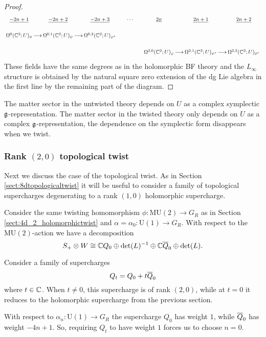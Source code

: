 \documentclass[10pt, oneside]{article}
\newcommand{\MU}{\mathrm{MU}}
\renewcommand{\U}{\mathrm{U}}
\begin{document}
\begin{proof}
\[
\xymatrix@R=0.5cm@C=0.5cm{
\ul{-2n+1} & \ul{-2n+2} & \ul{-2n+3} & \cdots & \ul{2n} & \ul{2n+1} & \ul{2n+2} \\ 
\Omega^0(\CC^2 ; U)_\phi \ar[r] & \Omega^{0,1}(\CC^2 ; U)_\psi \ar[r] & \Omega^{0,2}(\CC^2 ; U)_{\varphi^*} \\
& & & & \Omega^{2,0}(\CC^2 ; U)_{\varphi} \ar[r] & \Omega^{2,1}(\CC^2 ; U)_{\psi^*} \ar[r] & \Omega^{2,2}(\CC^2 ; U)_{\phi^*}
}
\]
These fields have the same degrees as in the holomorphic BF theory and the $L_\infty$ structure is obtained by the natural square zero extension of the dg Lie algebra in the first line by the remaining part of the diagram.
\end{proof}

\begin{remark}
The matter sector in the untwisted theory depends on $U$ as a complex symplectic $\fg$-representation. 
The matter sector in the twisted theory only depends on $U$ as a complex $\fg$-representation, the dependence on the symplectic form disappears when we twist.
\end{remark}

\subsubsection{Rank \texorpdfstring{$(2,0)$}{(2,0)} topological twist}
\label{sect:4d_2_donaldson}

Next we discuss the case of the topological twist. As in Section \ref{sect:8dtopologicaltwist} it will be useful to consider a family of topological supercharges degenerating to a rank $(1, 0)$ holomorphic supercharge.

Consider the same twisting homomorphism $\phi\colon \MU(2)\rightarrow G_R$ as in Section \ref{sect:4d_2_holomorphictwist} and $\alpha=\alpha_0\colon \U(1)\rightarrow G_R$. With respect to the $\MU(2)$-action we have a decomposition
\[S_+\otimes W\cong \CC Q_0 \oplus \det(L)^{-1}\oplus \CC \Bar{Q}_0\oplus \det(L).\]

Consider a family of supercharges
\begin{equation} 
\label{eq:4dHodgefamily}
Q_t = Q_0 + t \Bar{Q}_0
\end{equation}
where $t \in \CC$. When $t \ne 0$, this supercharge is of rank $(2,0)$, while at $t = 0$ it reduces to the holomorphic supercharge from the previous section.

\begin{remark}
With respect to $\alpha_n\colon \U(1)\rightarrow G_R$ the supercharge $Q_0$ has weight $1$, while $\Bar{Q}_0$ has weight $-4n+1$. So, requiring $Q_t$ to have weight $1$ forces us to choose $n=0$.
\end{remark}
\end{document}
